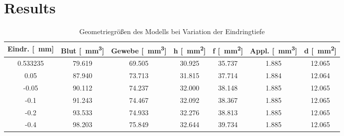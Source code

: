 \section{Results}
\setcounter{figure}{0}
\setcounter{table}{0}
\begin{table} [!h]
\caption{Geometriegrößen des Modells bei Variation der Eindringtiefe}
\begin{center}
\begin{tabular}{ccccccc}
\toprule 
Eindr. [\SI{}{\milli\metre}]& Blut [\SI{}{\cubic\milli\metre}] & Gewebe [\SI{}{\cubic\milli\metre}] & \textbf{h} [\SI{}{\square\milli\metre}] & \textbf{f} [\SI{}{\square\milli\metre}] & Appl. [\SI{}{\cubic\milli\metre}] & \textbf{d} [\SI{}{\square\milli\metre}]\\ 
\midrule[1.5pt] 
0.533235 & 79.619 & 69.505 & 30.925 & 35.737 & 1.885 & 12.065 \\ \midrule
0.05 & 87.940 & 73.713 & 31.815 & 37.714 & 1.884 & 12.064 \\ \midrule
-0.05 & 90.112 & 74.237 & 32.000 & 38.148 & 1.885 & 12.065 \\ \midrule
-0.1 & 91.243 & 74.467 & 32.092 & 38.367 & 1.885 & 12.065 \\ \midrule
-0.2 & 93.533 & 74.933 & 32.276 & 38.813 & 1.885 & 12.065 \\ \midrule
-0.4 & 98.203 & 75.849 & 32.644 & 39.734 & 1.885 & 12.065 \\ 
\bottomrule 
\end{tabular} 
\end{center}
\label{tab:11_DistanzEigenschaften}
\end{table}